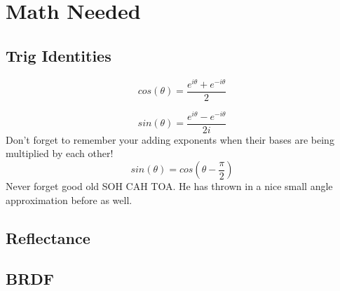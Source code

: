 \documentclass{article}
\begin{document}











\section{Math Needed}
\subsection{Trig Identities}
\begin{equation}
    cos(\theta)= \frac{e^{i \theta}+e^{-i \theta}}{2}
\end{equation}

\begin{equation}
    sin(\theta)= \frac{e^{i \theta}-e^{-i \theta}}{2i}
\end{equation}
Don't forget to remember your adding exponents when their bases are being multiplied by each other!
\begin{equation}
    sin(\theta)= cos(\theta - \frac{\pi}{2}) 
\end{equation}
Never forget good old SOH CAH TOA. 
He has thrown in a nice small angle approximation before as well. 


\subsection{Reflectance}

\subsection{BRDF}
\end{document}

